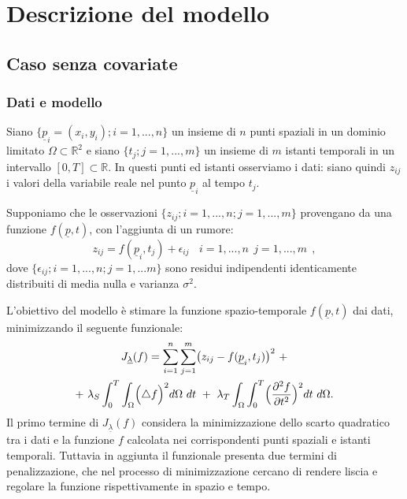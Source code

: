 \documentclass[a4paper,11pt,twoside,openright]{book}							%
\begin{document}
\chapter{Descrizione del modello}

\section{Caso senza covariate}

\subsection*{Dati e modello}

Siano $\{\underline p_i = (x_i,y_i); i=1, ... , n\}$ un insieme di $n$ punti spaziali in un dominio limitato $\Omega \subset \mathbb R^2$ e siano $\{t_j ; j=1, ... , m\}$ un insieme di $m$ istanti temporali in un intervallo $[0,T]\subset \mathbb R$. In questi punti ed istanti osserviamo i dati: siano quindi $z_{ij}$ i valori della variabile reale nel punto $\underline p_i$ al tempo $t_j$.

Supponiamo che le osservazioni $\{ z_{ij};i=1, ... , n; j=1, ... , m \}$ provengano da una funzione $f(\underline p, t)$, con l'aggiunta di un rumore:
\begin{equation}
\label{eq:modellobase}
z_{ij}=f(\underline p_i,t_j)+\epsilon_{ij}\ \ \ \ i = 1,...,n\ \ j=1,...,m \ \ ,
\end{equation}
dove $\{\epsilon_{ij}; i = 1,...,n; j=1,...m\}$ sono residui indipendenti identicamente distribuiti di media nulla e varianza $\sigma^2$.

L'obiettivo del modello è stimare la funzione spazio-temporale $f(\underline p, t)$ dai dati, minimizzando il seguente funzionale:
\begin{multline}
\label{eq:Jfunc}
J_{\underline \lambda }(f) = \sum_{i=1}^n \sum_{j=1}^m \bigl( z_{ij} - f(\underline p_i,t_j) \bigr)^2 \ + \\+\   \lambda_S \int_0^T \int_\Omega \Bigl( \triangle f  \Bigr)^2 d\Omega\ dt \ +\  \lambda_T \int_\Omega \int_0^T \Bigl( \frac{\partial^2 f }{\partial t ^2} \Bigr)^2 dt\ d\Omega .
\end{multline}
Il primo termine di $J_{\underline \lambda }(f)$ considera la minimizzazione dello scarto quadratico tra i dati e la funzione $f$ calcolata nei corrispondenti punti spaziali e istanti temporali. Tuttavia in aggiunta il funzionale presenta due termini di penalizzazione, che nel processo di minimizzazione cercano di rendere liscia e regolare la funzione rispettivamente in spazio e tempo.
\end{document}
